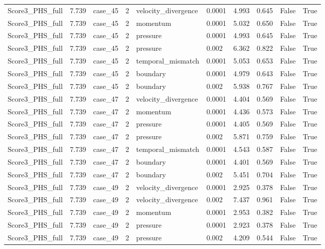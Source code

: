 \begin{longtable}{llllllllll}
Score3\_PHS\_full & 7.739 & case\_45 & 2 & velocity\_divergence & 0.0001 & 4.993 & 0.645 & False & True \\
Score3\_PHS\_full & 7.739 & case\_45 & 2 & momentum & 0.0001 & 5.032 & 0.650 & False & True \\
Score3\_PHS\_full & 7.739 & case\_45 & 2 & pressure & 0.0001 & 4.993 & 0.645 & False & True \\
Score3\_PHS\_full & 7.739 & case\_45 & 2 & pressure & 0.002 & 6.362 & 0.822 & False & True \\
Score3\_PHS\_full & 7.739 & case\_45 & 2 & temporal\_mismatch & 0.0001 & 5.053 & 0.653 & False & True \\
Score3\_PHS\_full & 7.739 & case\_45 & 2 & boundary & 0.0001 & 4.979 & 0.643 & False & True \\
Score3\_PHS\_full & 7.739 & case\_45 & 2 & boundary & 0.002 & 5.938 & 0.767 & False & True \\
Score3\_PHS\_full & 7.739 & case\_47 & 2 & velocity\_divergence & 0.0001 & 4.404 & 0.569 & False & True \\
Score3\_PHS\_full & 7.739 & case\_47 & 2 & momentum & 0.0001 & 4.436 & 0.573 & False & True \\
Score3\_PHS\_full & 7.739 & case\_47 & 2 & pressure & 0.0001 & 4.405 & 0.569 & False & True \\
Score3\_PHS\_full & 7.739 & case\_47 & 2 & pressure & 0.002 & 5.871 & 0.759 & False & True \\
Score3\_PHS\_full & 7.739 & case\_47 & 2 & temporal\_mismatch & 0.0001 & 4.543 & 0.587 & False & True \\
Score3\_PHS\_full & 7.739 & case\_47 & 2 & boundary & 0.0001 & 4.401 & 0.569 & False & True \\
Score3\_PHS\_full & 7.739 & case\_47 & 2 & boundary & 0.002 & 5.451 & 0.704 & False & True \\
Score3\_PHS\_full & 7.739 & case\_49 & 2 & velocity\_divergence & 0.0001 & 2.925 & 0.378 & False & True \\
Score3\_PHS\_full & 7.739 & case\_49 & 2 & velocity\_divergence & 0.002 & 7.437 & 0.961 & False & True \\
Score3\_PHS\_full & 7.739 & case\_49 & 2 & momentum & 0.0001 & 2.953 & 0.382 & False & True \\
Score3\_PHS\_full & 7.739 & case\_49 & 2 & pressure & 0.0001 & 2.923 & 0.378 & False & True \\
Score3\_PHS\_full & 7.739 & case\_49 & 2 & pressure & 0.002 & 4.209 & 0.544 & False & True \\

\end{longtable}
